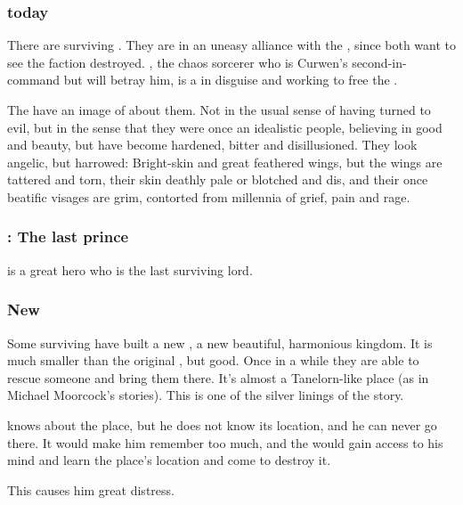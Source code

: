\subsubsection{\Kezeradi{} today}
There are surviving \Kezeradi. They are in an uneasy alliance with the , since both want to see the \bane{} faction destroyed. \Sanyor, the \scathaese{} chaos sorcerer who is Curwen's second-in-command but will betray him, is a \cuezcan{} in disguise and working to free the \Sephiroth. 

The \Kezeradi{} have an image of  about them. Not  in the usual sense of having turned to evil, but in the sense that they were once an idealistic people, believing in good and beauty, but have become hardened, bitter and disillusioned. They look angelic, but harrowed: Bright-\coloured skin and great feathered wings, but the wings are tattered and torn, their skin deathly pale or blotched and dis\coloured, and their once beatific visages are grim, contorted from millennia of grief, pain and rage. 





\subsubsection{\Sithiyacaan: The last \Kezeradi{} prince}
 is a great hero who is the last surviving \Kezeradi{} lord. 





\subsubsection{New \Kezerad}
Some surviving \Kezeradi{} have built a new \Kezerad, a new beautiful, harmonious kingdom. It is much smaller than the original \Kezerad, but good. Once in a while they are able to rescue someone and bring them there. It's almost a Tanelorn-like place (as in Michael Moorcock's stories). This is one of the silver linings of the story. 

 knows about the place, but he does not know its location, and he can never go there. It would make him remember too much, and the \Sephiroth{} would gain access to his mind and learn the place's location and come to destroy it. 

This causes him great distress. 









